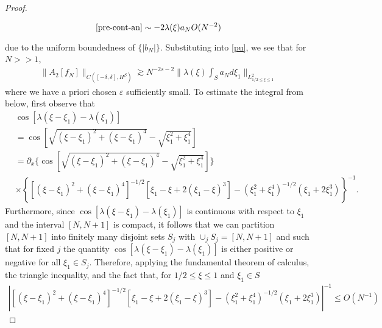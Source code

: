 \documentclass[12pt,reqno]{amsart}
\numberwithin{equation}{section}  %
\newcommand{\p}{\partial}
\newcommand{\ee}{\varepsilon}
\begin{document}
\begin{proof}
\begin{framed}
\begin{equation*}
  \eqref{pre-cont-an} \sim -2 \lambda(\xi) a_{N} O(N^{-2})
 \end{equation*}
%
 \end{framed}
%
due to the uniform boundedness of $\{|b_{N}|\}$. Substituting into \eqref{pu}, we see that for $N > > 1$,  
%
%
\begin{equation*}
\begin{split}
\|A_{2}[f_{N}]\|_{C( [-\delta, \delta], H^{\beta})}
\gtrsim N^{-2 s -2} \|  \lambda(\xi) \int_{S}a_{N} d \xi_{1} \|_{L^{2}_{1/2 \le \xi \le 1}}
\end{split}
\end{equation*}
%
where we have a priori chosen $\ee$ sufficiently small.
%
To estimate the integral from below, first observe that 
\begin{equation*}
\begin{split}
  & \cos[\lambda(\xi - \xi_{1}) - \lambda(\xi_{1})] 
  \\
  & = \cos\left[ \sqrt{(\xi - \xi_{1})^{2} + (\xi - \xi_{1})^{4}} - \sqrt{\xi_{1}^{2} + \xi_{1}^{4}} \right] 
  \\
  & = \p_{x} \{ \cos\left[ \sqrt{(\xi - \xi_{1})^{2} + (\xi - \xi_{1})^{4}} - \sqrt{\xi_{1}^{2} + \xi_{1}^{4}} \right] \} 
  \\
  & \times \left\{ [(\xi - \xi_{1})^{2} + (\xi - \xi_{1})^{4}]^{-1/2}[\xi_{1} - \xi + 2(\xi_{1} - \xi)^{3}] - (\xi_{1}^{2} + \xi_{1}^{4})^{-1/2} (\xi_{1} + 2 \xi_{1}^{3}) \right\}^{-1}.
\end{split}
\end{equation*}
%
%
Furthermore, since $\cos[\lambda(\xi - \xi_{1}) - \lambda(\xi_{1})]$ is continuous with respect to $\xi_{1}$ and the interval $[N, N+1]$ is compact, it follows that we can partition $[N, N+1]$ into finitely many disjoint sets $S_{j}$ with $\cup_{j} S_{j} = [N, N+1]$ and such that for fixed $j$ the quantity $\cos[\lambda(\xi - \xi_{1}) - \lambda(\xi_{1})]$ is either positive or negative for all $\xi_{1} \in S_{j}$. Therefore, applying the fundamental theorem of calculus, the triangle inequality, and the fact that, for $1/2 \le \xi \le 1$ and $\xi_{1} \in S$
%
%
\begin{equation*}
\begin{split}
  \left | [(\xi - \xi_{1})^{2} + (\xi - \xi_{1})^{4}]^{-1/2}[\xi_{1} - \xi + 2(\xi_{1} - \xi)^{3}] - (\xi_{1}^{2} + \xi_{1}^{4})^{-1/2} (\xi_{1} + 2 \xi_{1}^{3}) \right | ^{-1} \le O(N^{-1}) 
\end{split}
\end{equation*}

\end{proof}
\end{document}
